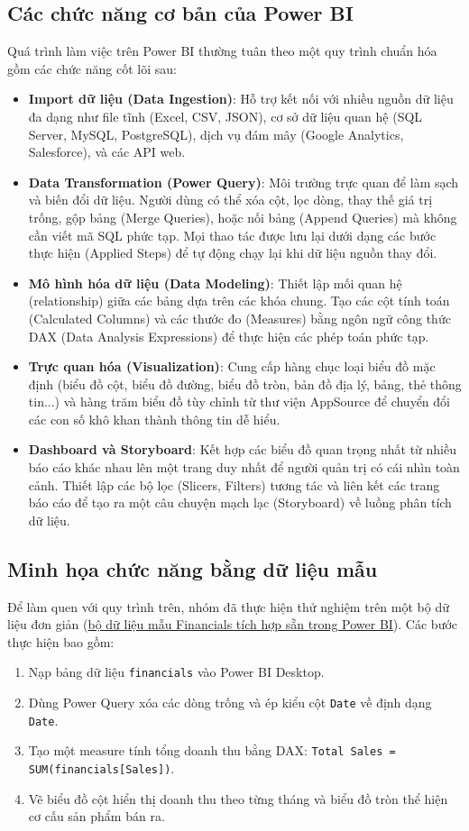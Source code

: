 \subsection{Các chức năng cơ bản của Power BI}
Quá trình làm việc trên Power BI thường tuân theo một quy trình chuẩn hóa gồm các chức năng cốt lõi sau:
\begin{itemize}
    \item \textbf{Import dữ liệu (Data Ingestion)}: Hỗ trợ kết nối với nhiều nguồn dữ liệu đa dạng như file tĩnh (Excel, CSV, JSON), cơ sở dữ liệu quan hệ (SQL Server, MySQL, PostgreSQL), dịch vụ đám mây (Google Analytics, Salesforce), và các API web.
    \item \textbf{Data Transformation (Power Query)}: Môi trường trực quan để làm sạch và biến đổi dữ liệu. Người dùng có thể xóa cột, lọc dòng, thay thế giá trị trống, gộp bảng (Merge Queries), hoặc nối bảng (Append Queries) mà không cần viết mã SQL phức tạp. Mọi thao tác được lưu lại dưới dạng các bước thực hiện (Applied Steps) để tự động chạy lại khi dữ liệu nguồn thay đổi.
    \item \textbf{Mô hình hóa dữ liệu (Data Modeling)}: Thiết lập mối quan hệ (relationship) giữa các bảng dựa trên các khóa chung. Tạo các cột tính toán (Calculated Columns) và các thước đo (Measures) bằng ngôn ngữ công thức DAX (Data Analysis Expressions) để thực hiện các phép toán phức tạp.
    \item \textbf{Trực quan hóa (Visualization)}: Cung cấp hàng chục loại biểu đồ mặc định (biểu đồ cột, biểu đồ đường, biểu đồ tròn, bản đồ địa lý, bảng, thẻ thông tin...) và hàng trăm biểu đồ tùy chỉnh từ thư viện AppSource để chuyển đổi các con số khô khan thành thông tin dễ hiểu.
    \item \textbf{Dashboard và Storyboard}: Kết hợp các biểu đồ quan trọng nhất từ nhiều báo cáo khác nhau lên một trang duy nhất để người quản trị có cái nhìn toàn cảnh. Thiết lập các bộ lọc (Slicers, Filters) tương tác và liên kết các trang báo cáo để tạo ra một câu chuyện mạch lạc (Storyboard) về luồng phân tích dữ liệu.
\end{itemize}

\subsection{Minh họa chức năng bằng dữ liệu mẫu}
Để làm quen với quy trình trên, nhóm đã thực hiện thử nghiệm trên một bộ dữ liệu đơn giản (\href{https://drive.google.com/drive/folders/15G17ukMnO5SE3tEGr7q1lfL1cEJYrSk0?usp=drive_link}{bộ dữ liệu mẫu Financials tích hợp sẵn trong Power BI}). Các bước thực hiện bao gồm:
\begin{enumerate}
    \item Nạp bảng dữ liệu \texttt{financials} vào Power BI Desktop.
    \item Dùng Power Query xóa các dòng trống và ép kiểu cột \texttt{Date} về định dạng \texttt{Date}.
    \item Tạo một measure tính tổng doanh thu bằng DAX: \texttt{Total Sales = SUM(financials[Sales])}.
    \item Vẽ biểu đồ cột hiển thị doanh thu theo từng tháng và biểu đồ tròn thể hiện cơ cấu sản phẩm bán ra.
\end{enumerate}

